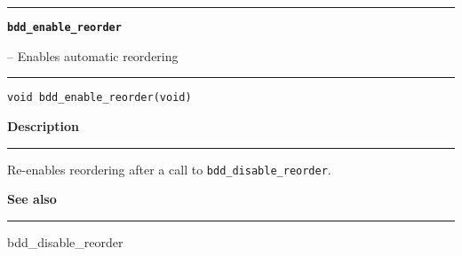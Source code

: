 \vspace{8ex}
\begin{minipage}{\textwidth}

\noindent\begin{minipage}{\textwidth}
\rule{\textwidth}{0.5mm}
{\tt\bf bdd\_enable\_reorder }
\--- Enables automatic reordering  \hspace{\fill}
\\\rule[1.5ex]{\textwidth}{0.5mm}
\end{minipage}

\noindent\begin{verbatim}
void bdd_enable_reorder(void) 
\end{verbatim}

\vspace{\parsep}\noindent
{\bf Description}\\\rule[1.5ex]{\textwidth}{0.2mm}\vspace{-1.5ex}\setlength{\parindent}{1em}
Re-enables reordering after a call to {\tt bdd\_disable\_reorder}. 

\vspace{\parsep}\vspace{\baselineskip}\noindent
{\bf See also}\\\rule[1.5ex]{\textwidth}{0.2mm}\vspace{-1.5ex}
bdd\_disable\_reorder 
\end{minipage}
\vspace{8ex}

